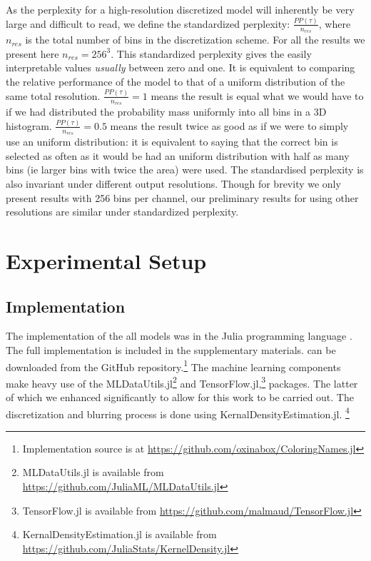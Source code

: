 \documentclass[11pt,a4paper]{article}
\newcommand{\parencite}{\citep}
\begin{document}
As the perplexity for a high-resolution discretized model will inherently be very large and difficult to read,
we define the standardized perplexity: $\frac{PP(\tau)}{n_{res}}$,
where $n_{res}$ is the total number of bins in the discretization scheme.
For all the results we present here $n_{res} = 256^3$.
This standardized perplexity gives the easily interpretable values \emph{usually} between zero and one.
It is equivalent to comparing the relative performance of the model to that of a uniform distribution of the same total resolution.
$\frac{PP(\tau)}{n_{res}}=1$ means the result is equal what we would have to if we had distributed the probability mass uniformly into all bins in a 3D histogram.
$\frac{PP(\tau)}{n_{res}}=0.5$ means the result twice as good as if we were to simply use an uniform distribution: it is equivalent to saying that the correct bin is selected as often as it would be had an uniform distribution with half as many bins (ie larger bins with twice the area) were used.
The standardised perplexity is also invariant under different output resolutions.
Though for brevity we only  present results with 256 bins per channel, our preliminary results for using other resolutions are similar under standardized perplexity.



\section{Experimental Setup}

\subsection{Implementation}
The implementation of the all models was in the Julia programming language \parencite{Julia}.
The full implementation is included in the supplementary materials.
can be downloaded from the GitHub repository.\footnote{Implementation source is at \url{https://github.com/oxinabox/ColoringNames.jl}}
The machine learning components make heavy use of the MLDataUtils.jl\footnote{MLDataUtils.jl is available from \url{https://github.com/JuliaML/MLDataUtils.jl}} and TensorFlow.jl,\footnote{TensorFlow.jl is available from \url{https://github.com/malmaud/TensorFlow.jl}} packages.
The latter of which we enhanced significantly to allow for this work to be carried out.
The discretization and blurring process is done using KernalDensityEstimation.jl.%
\footnote{KernalDensityEstimation.jl  is available from \url{https://github.com/JuliaStats/KernelDensity.jl}}
\end{document}
